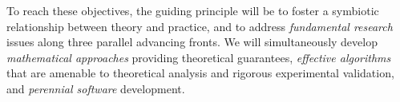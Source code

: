 To reach these objectives, the guiding principle will be to foster a
symbiotic relationship between theory and practice, and to address
{\em fundamental research} issues along three parallel advancing
fronts. We will simultaneously develop {\em mathematical approaches}
providing theoretical guarantees, {\em effective algorithms} that are
amenable to theoretical analysis and rigorous experimental validation,
and {\em perennial software} development. %


